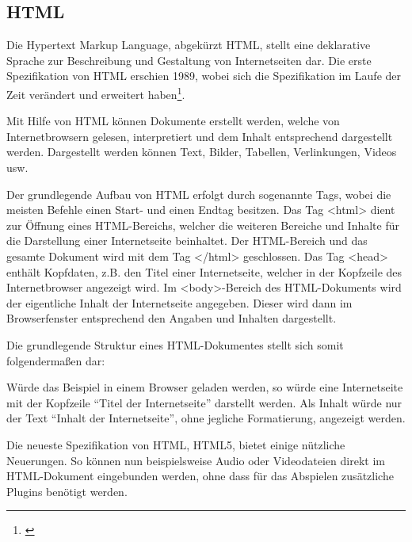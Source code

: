 \subsection{HTML}
\label{sec:Html}

Die Hypertext Markup Language, abgekürzt HTML, stellt eine deklarative Sprache
zur Beschreibung und Gestaltung von Internetseiten dar. Die erste Spezifikation
von HTML erschien 1989, wobei sich die Spezifikation im Laufe der Zeit
verändert und erweitert haben\footnote{\citet[S.~27ff]{taglinger2003}}.

Mit Hilfe von HTML können Dokumente erstellt werden, welche von Internetbrowsern
gelesen, interpretiert und dem Inhalt entsprechend dargestellt werden.
Dargestellt werden können Text, Bilder, Tabellen, Verlinkungen, Videos usw.

Der grundlegende Aufbau von HTML erfolgt durch sogenannte Tags, wobei
die meisten Befehle einen Start- und einen Endtag besitzen.
Das Tag <html> dient zur Öffnung eines HTML-Bereichs, welcher die weiteren
Bereiche und Inhalte für die Darstellung einer Internetseite beinhaltet. Der
HTML-Bereich und das gesamte Dokument wird mit dem Tag </html> geschlossen. Das
Tag <head> enthält Kopfdaten, z.B. den Titel einer Internetseite, welcher in
der Kopfzeile des Internetbrowser angezeigt wird. Im <body>-Bereich des
HTML-Dokuments wird der eigentliche Inhalt der Internetseite angegeben. Dieser
wird dann im Browserfenster entsprechend den Angaben und Inhalten dargestellt.

Die grundlegende Struktur eines HTML-Dokumentes stellt sich somit folgendermaßen
dar:



Würde das Beispiel in einem Browser geladen werden, so würde eine
Internetseite mit der Kopfzeile "`Titel der Internetseite"' darstellt werden.
Als Inhalt würde nur der Text "`Inhalt der Internetseite"', ohne jegliche
Formatierung, angezeigt werden.

Die neueste Spezifikation von HTML, HTML5, bietet einige nützliche Neuerungen.
So können nun beispielsweise Audio oder Videodateien direkt im
HTML-Dokument eingebunden werden, ohne dass für das Abspielen zusätzliche
Plugins benötigt werden.
